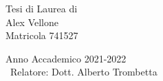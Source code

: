 \begin{titlepage}
\begin{center}
    \vfill
    \begin{large}
      Tesi di Laurea di\\
      Alex Vellone\\
      Matricola 741527\\
      \vspace{0.5cm}

    \end{large}

    Anno Accademico 2021-2022\\\
    Relatore: Dott. Alberto Trombetta

  \end{center}
\end{titlepage}
